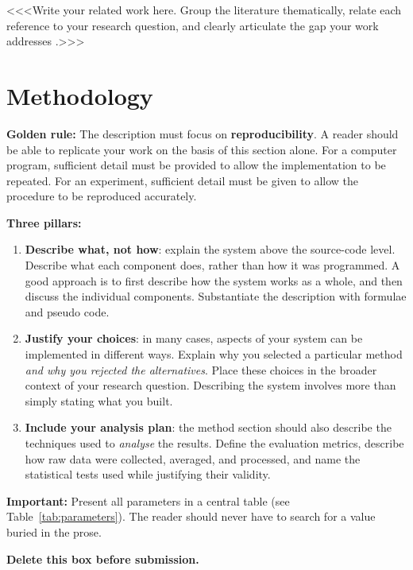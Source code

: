\documentclass[12pt,a4paper,twocolumn]{article}
\begin{document}
\noindent
<<<Write your related work here. Group the literature thematically, relate
each reference to your research question, and clearly articulate the gap
your work addresses \cite{dawkins1976,brown2020}.>>>


\section{Methodology}
\label{sec:methods}

\begin{guidancebox}
\textbf{Golden rule:} The description must focus on \textbf{reproducibility}.
A reader should be able to replicate your work on the basis of this section alone.
For a computer program, sufficient detail must be provided to allow the
implementation to be repeated. For an experiment, sufficient detail must
be given to allow the procedure to be reproduced accurately.

\textbf{Three pillars:}
\begin{enumerate}[leftmargin=*, nosep]
  \item \textbf{Describe what, not how}: explain the system above the
    source-code level. Describe what each component does, rather than how
    it was programmed. A good approach is to first describe how the system
    works as a whole, and then discuss the individual components.
    Substantiate the description with formulae and pseudo code.
  \item \textbf{Justify your choices}: in many cases, aspects of your
    system can be implemented in different ways. Explain why you selected
    a particular method \emph{and why you rejected the alternatives}.
    Place these choices in the broader context of your research question.
    Describing the system involves more than simply stating what you built.
  \item \textbf{Include your analysis plan}: the method section should
    also describe the techniques used to \emph{analyse} the results.
    Define the evaluation metrics, describe how raw data were collected,
    averaged, and processed, and name the statistical tests used while
    justifying their validity.
\end{enumerate}

\textbf{Important:} Present all parameters in a central table (see
Table~\ref{tab:parameters}). The reader should never have to search for a
value buried in the prose.

\textbf{Delete this box before submission.}
\end{guidancebox}
\end{document}
